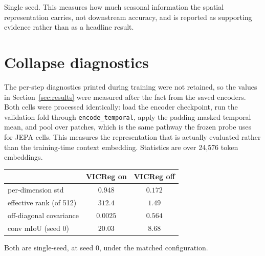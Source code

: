 \documentclass{article}
\begin{document}
Single seed. This measures how much seasonal information the spatial representation carries, not
downstream accuracy, and is reported as supporting evidence rather than as a headline result.

\section{Collapse diagnostics}
\label{app:collapse}

The per-step diagnostics printed during training were not retained, so the values in
Section~\ref{sec:results} were measured after the fact from the saved encoders. Both cells were
processed identically: load the encoder checkpoint, run the validation fold through
\texttt{encode\_temporal}, apply the padding-masked temporal mean, and pool over patches, which is the
same pathway the frozen probe uses for JEPA cells. This measures the representation that is actually
evaluated rather than the training-time context embedding. Statistics are over 24{,}576 token
embeddings.

\begin{center}\small
\begin{tabular}{lcc}
\toprule
 & VICReg on & VICReg off \\
\midrule
per-dimension std        & $0.948$   & $0.172$ \\
effective rank (of 512)  & $312.4$   & $1.49$ \\
off-diagonal covariance  & $0.0025$  & $0.564$ \\
conv mIoU (seed 0)       & $20.03$   & $8.68$ \\
\bottomrule
\end{tabular}
\end{center}

Both are single-seed, at seed 0, under the matched configuration.
\end{document}
